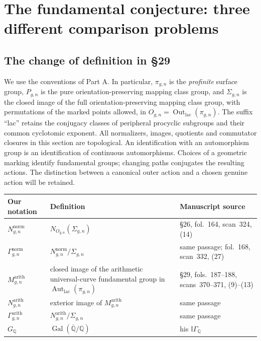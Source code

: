 \section{The fundamental conjecture: three different comparison problems}\label{sec:E}

\subsection{The change of definition in \S29}

We use the conventions of Part A.  In particular, $\pi_{g,n}$ is the
\emph{profinite} surface group, $P_{g,n}$ is the pure orientation-preserving
mapping class group, and $\Sigma_{g,n}$ is the closed image of the full
orientation-preserving mapping class group, with permutations of the marked
points allowed, in
$O_{g,n}=\operatorname{Out}_{\mathrm{lac}}(\pi_{g,n})$.
The suffix ``lac'' retains the conjugacy classes of peripheral procyclic
subgroups and their common cyclotomic exponent.  All normalizers, images,
quotients and commutator closures in this section are topological.  An
identification with an automorphism group is an identification of continuous
automorphisms.  Choices of a geometric marking identify fundamental groups;
changing paths conjugates the resulting actions.  The distinction between a
canonical outer action and a chosen genuine action will be retained.

\begin{center}
\begin{tabular}{L{.20\linewidth}L{.45\linewidth}L{.26\linewidth}}
Our notation & Definition & Manuscript source\\ \hline
$N^{\mathrm{norm}}_{g,n}$ &
$N_{O_{g,n}}(\Sigma_{g,n})$ & \S26, fol.~164, scan~324, (14)\\
$\Gamma^{\mathrm{norm}}_{g,n}$ &
$N^{\mathrm{norm}}_{g,n}/\Sigma_{g,n}$ & same passage; fol.~168, scan~332, (27)\\
$M^{\mathrm{arith}}_{g,n}$ & closed image of the arithmetic universal-curve
fundamental group in $\operatorname{Aut}_{\mathrm{lac}}(\pi_{g,n})$ &
\S29, fols.~187--188, scans~370--371, (9)--(13)\\
$N^{\mathrm{arith}}_{g,n}$ & exterior image of $M^{\mathrm{arith}}_{g,n}$ & same passage\\
$\Gamma^{\mathrm{arith}}_{g,n}$ &
$N^{\mathrm{arith}}_{g,n}/\Sigma_{g,n}$ & same passage\\
$G_{\mathbb Q}$ & $\operatorname{Gal}(\overline{\mathbb Q}/\mathbb Q)$ &
his $\mathbb I\Gamma_{\mathbb Q}$\\
\end{tabular}
\end{center}

